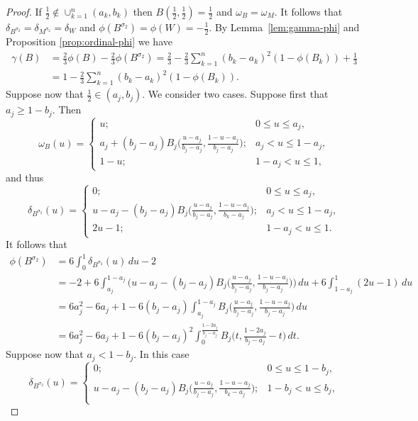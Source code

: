 \documentclass[10pt,a4paper]{amsart}
\begin{document}
\begin{proof}
If $\tfrac12 \notin \cup_{k=1}^n(a_k, b_k)$ then $B(\tfrac12,\tfrac12)=\tfrac12$ and 
$\omega_B = \omega_M$. It follows that $\delta_{B^{\sigma_2}} = \delta_{M^{\sigma_2}} = \delta_{W}$ and $\phi(B^{\sigma_2}) = \phi(W) = -\tfrac12$.
By Lemma~\ref{lem:gamma-phi} and Proposition \ref{prop:ordinal-phi} we have
\begin{align*}
   \gamma(B) &= \tfrac23 \phi(B) - \tfrac23 \phi(B^{\sigma_2}) = \tfrac23 - \tfrac23\sum_{k=1}^n (b_k-a_k)^2(1-\phi(B_k)) + \tfrac13 \\
   &= 1 - \tfrac23\sum_{k=1}^n (b_k-a_k)^2(1-\phi(B_k)). 
\end{align*}
Suppose now that $\tfrac12 \in (a_j,b_j)$. We consider two cases. Suppose first that $a_j\ge 1-b_j$.
Then
$$\omega_B(u) = \begin{cases} u; & 0 \le u \le a_j,\\
		a_j + (b_j-a_j)B_j\big(\frac{u-a_j}{b_j-a_j}, \frac{1-u-a_j}{b_j-a_j}\big); & a_j < u \le 1-a_j,\\
		1-u; &  1-a_j < u \le 1,
    \end{cases}$$
and thus
$$\delta_{B^{\sigma_2}}(u) = \begin{cases} 0; & 0 \le u \le a_j,\\
		u - a_j - (b_j-a_j)B_j\big(\frac{u-a_j}{b_j-a_j}, \frac{1-u-a_j}{b_k-a_j}\big); & a_j < u \le 1-a_j,\\
		2u-1; &  1-a_j < u \le 1.
    \end{cases}$$
It follows that 
\begin{align*}
\phi(B^{\sigma_2}) &= 6 \int_0^1 \delta_{B^{\sigma_2}}(u) \, du -2 \\
&= -2 + 6\int_{a_j}^{1-a_j} \big(u - a_j - (b_j-a_j)B_j\big(\tfrac{u-a_j}{b_j-a_j}, \tfrac{1-u-a_j}{b_j-a_j}\big)\big) \, du + 6\int_{1-a_j}^1 (2u-1) \, du \\
&= 6a_j^2-6a_j+1 - 6(b_j-a_j)\int_{a_j}^{1-a_j} B_j\big(\tfrac{u-a_j}{b_j-a_j}, \tfrac{1-u-a_j}{b_j-a_j}\big) \, du \\
&= 6a_j^2-6a_j+1 - 6(b_j-a_j)^2\int_{0}^{\frac{1-2a_j}{b_j-a_j}} B_j\big(t, \tfrac{1-2a_j}{b_j-a_j}-t\big) \, dt. 
\end{align*}
Suppose now that $a_j < 1-b_j$. In this case 
$$\delta_{B^{\sigma_2}}(u) = \begin{cases} 0; & 0 \le u \le 1-b_j,\\
		u - a_j - (b_j-a_j)B_j\big(\frac{u-a_j}{b_j-a_j}, \frac{1-u-a_j}{b_k-a_j}\big); & 1-b_j < u \le b_j,\\

\end{cases}$$
\end{proof}
\end{document}
